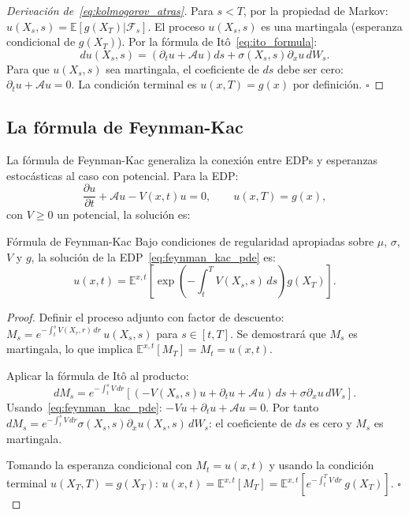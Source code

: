 \begin{proof}[Derivación de~\eqref{eq:kolmogorov_atras}]
Para $s < T$, por la propiedad de Markov:
$u(X_s,s) = \mathbb{E}[g(X_T)|\mathcal{F}_s]$.
El proceso $u(X_s,s)$ es una martingala (esperanza condicional de $g(X_T)$).
Por la fórmula de Itô~\eqref{eq:ito_formula}:
\[
  du(X_s,s) = \left(\partial_t u + \mathcal{A}u\right)ds
  + \sigma(X_s,s)\partial_x u\,dW_s.
\]
Para que $u(X_s,s)$ sea martingala, el coeficiente de $ds$ debe ser cero:
$\partial_t u + \mathcal{A}u = 0$. La condición terminal es $u(x,T) = g(x)$
por definición. $\square$
\end{proof}

\subsection{La fórmula de Feynman-Kac}
\label{subsec:feynman_kac}

La fórmula de Feynman-Kac generaliza la conexión entre EDPs y esperanzas
estocásticas al caso con potencial. Para la EDP:
\begin{equation}
  \frac{\partial u}{\partial t} + \mathcal{A}u - V(x,t)u = 0,
  \qquad u(x,T) = g(x),
  \label{eq:feynman_kac_pde}
\end{equation}
con $V \geq 0$ un potencial, la solución es:

\begin{teorema}{Fórmula de Feynman-Kac}
\label{thm:feynman_kac}
Bajo condiciones de regularidad apropiadas sobre $\mu$, $\sigma$, $V$ y $g$,
la solución de la EDP~\eqref{eq:feynman_kac_pde} es:
\begin{equation}
  u(x,t)
  = \mathbb{E}^{x,t}\!\left[
    \exp\!\left(-\int_t^T V(X_s,s)\,ds\right) g(X_T)
  \right].
  \label{eq:feynman_kac}
\end{equation}
\end{teorema}

\begin{proof}
Definir el proceso adjunto con factor de descuento:
$M_s = e^{-\int_t^s V(X_r,r)\,dr}\,u(X_s,s)$ para $s \in [t,T]$.
Se demostrará que $M_s$ es martingala, lo que implica
$\mathbb{E}^{x,t}[M_T] = M_t = u(x,t)$.

Aplicar la fórmula de Itô al producto:
\[
  dM_s = e^{-\int_t^s V\,dr}\left[
    (-V(X_s,s)u + \partial_t u + \mathcal{A}u)\,ds
    + \sigma\partial_x u\,dW_s
  \right].
\]
Usando~\eqref{eq:feynman_kac_pde}: $-Vu + \partial_t u + \mathcal{A}u = 0$.
Por tanto $dM_s = e^{-\int_t^s V\,dr}\sigma(X_s,s)\partial_x u(X_s,s)\,dW_s$:
el coeficiente de $ds$ es cero y $M_s$ es martingala.

Tomando la esperanza condicional con $M_t = u(x,t)$ y usando la condición
terminal $u(X_T,T) = g(X_T)$:
$u(x,t) = \mathbb{E}^{x,t}[M_T]
= \mathbb{E}^{x,t}[e^{-\int_t^T V\,dr}\,g(X_T)]$. $\square$
\end{proof}

